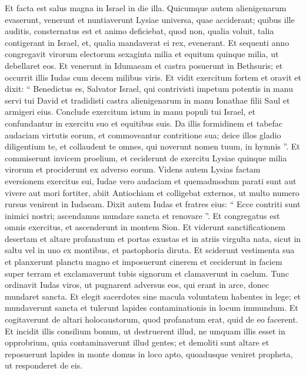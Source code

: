 \begin{biblechapter}
\begin{biblechapter}
\begin{biblechapter}
\begin{biblechapter}
\verse Et facta est salus magna in Israel in die illa.
 \verse Quicumque autem alienigenarum evaserunt, venerunt et nuntiaverunt Lysiae universa, quae acciderant; 
\verse quibus ille auditis, consternatus est et animo deficiebat, quod non, qualia voluit, talia contigerant in Israel, et, qualia mandaverat ei rex, evenerant.
 \verse Et sequenti anno congregavit virorum electorum sexaginta milia et equitum quinque milia, ut debellaret eos. 
\verse Et venerunt in Idumaeam et castra posuerunt in Bethsuris; et occurrit illis Iudas cum decem milibus viris. 
\verse Et vidit exercitum fortem et oravit et dixit: “ Benedictus es, Salvator Israel, qui contrivisti impetum potentis in manu servi tui David et tradidisti castra alienigenarum in manu Ionathae filii Saul et armigeri eius. 
\verse Conclude exercitum istum in manu populi tui Israel, et confundantur in exercitu suo et equitibus suis. 
\verse Da illis formidinem et tabefac audaciam virtutis eorum, et commoveantur contritione sua; 
\verse deice illos gladio diligentium te, et collaudent te omnes, qui noverunt nomen tuum, in hymnis ”.
 \verse Et commiserunt invicem proelium, et ceciderunt de exercitu Lysiae quinque milia virorum et prociderunt ex adverso eorum. 
\verse Videns autem Lysias factam eversionem exercitus sui, Iudae vero audaciam et quemadmodum parati sunt aut vivere aut mori fortiter, abiit Antiochiam et colligebat externos, ut multo numero rursus venirent in Iudaeam. 
\verse Dixit autem Iudas et fratres eius: “ Ecce contriti sunt inimici nostri; ascendamus mundare sancta et renovare ”. 
 \verse Et congregatus est omnis exercitus, et ascenderunt in montem Sion. 
\verse Et viderunt sanctificationem desertam et altare profanatum et portas exustas et in atriis virgulta nata, sicut in saltu vel in uno ex montibus, et pastophoria diruta. 
\verse Et sciderunt vestimenta sua et planxerunt planctu magno et imposuerunt cinerem 
\verse et ceciderunt in faciem super terram et exclamaverunt tubis signorum et clamaverunt in caelum. 
\verse Tunc ordinavit Iudas viros, ut pugnarent adversus eos, qui erant in arce, donec mundaret sancta.
 \verse Et elegit sacerdotes sine macula voluntatem habentes in lege; 
\verse et mundaverunt sancta et tulerunt lapides contaminationis in locum immundum. 
\verse Et cogitaverunt de altari holocaustorum, quod profanatum erat, quid de eo facerent. 
\verse Et incidit illis consilium bonum, ut destruerent illud, ne umquam illis esset in opprobrium, quia contaminaverunt illud gentes; et demoliti sunt altare 
 \verse et reposuerunt lapides in monte domus in loco apto, quoadusque veniret propheta, ut responderet de eis. 

\end{biblechapter}
\end{biblechapter}
\end{biblechapter}
\end{biblechapter}

